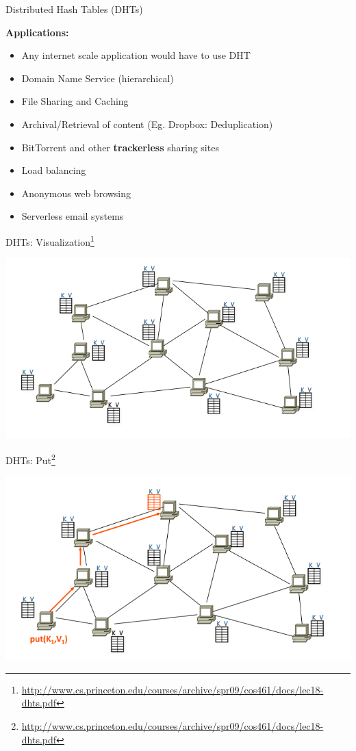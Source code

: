 \documentclass{beamer}
\begin{document}
\begin{frame}{Distributed Hash Tables (DHTs)}
    
    {\bf Applications:}
    \begin{itemize}
        \item Any internet scale application would have to use DHT
        \item Domain Name Service (hierarchical)
        \item File Sharing and Caching
        \item Archival/Retrieval of content (Eg. Dropbox: Deduplication)
        \item BitTorrent and other {\bf trackerless} sharing sites
        \item Load balancing
        \item Anonymous web browsing 
        \item Serverless email systems
    \end{itemize}
\end{frame}

\begin{frame}{DHTs: Visualization\footnote{\url{http://www.cs.princeton.edu/courses/archive/spr09/cos461/docs/lec18-dhts.pdf}}}

    \begin{center}
        \includegraphics[scale=0.4]{dhtViz.png}
    \end{center}
\end{frame}

\begin{frame}{DHTs: Put\footnote{\url{http://www.cs.princeton.edu/courses/archive/spr09/cos461/docs/lec18-dhts.pdf}}}

    \begin{center}
        \includegraphics[scale=0.4]{dhtPut.png}
    \end{center}
\end{frame}
\end{document}

